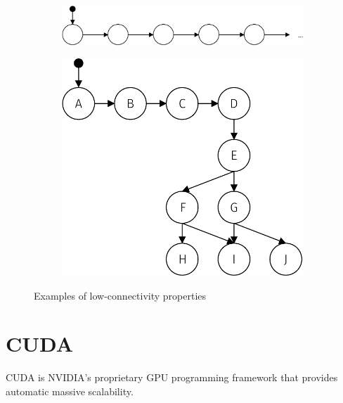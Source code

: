 \documentclass[
fancyheadings, %
%
%
]{stsreprt}
\begin{document}
\begin{figure}
    \begin{subfigure}[b]{.5\textwidth}
        \centering
        \includegraphics[width=\textwidth]{figures/lc-ex-generally-linear}
        \label{fig:lc-ex-generally-linear}
    \end{subfigure}
    \begin{subfigure}[b]{.5\textwidth}
        \centering
        \includegraphics[width=.9\textwidth]{figures/lc-ex-bottleneck}
        \label{fig:lc-ex-bottleneck}
    \end{subfigure}
    \caption{Examples of low-connectivity properties}
    \label{fig:lc-ex}
\end{figure}

\section{CUDA}

CUDA is NVIDIA's proprietary GPU programming framework that provides automatic massive scalability.
\end{document}
